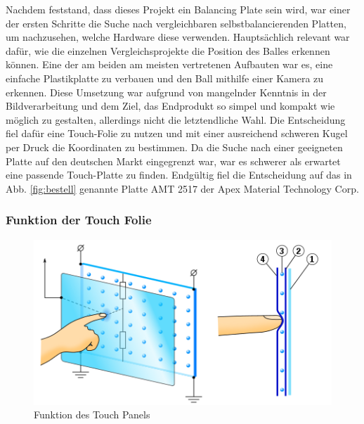 \documentclass[12pt,a4paper,bibliography=totoc,listof=totoc]{scrartcl}
\begin{document}
Nachdem feststand, dass dieses Projekt ein Balancing Plate sein wird, war einer der ersten Schritte die Suche nach vergleichbaren selbstbalancierenden Platten, um nachzusehen, welche Hardware diese verwenden. Hauptsächlich relevant war dafür, wie die einzelnen Vergleichsprojekte die Position des Balles erkennen können. Eine der am beiden am meisten vertretenen Aufbauten war es, eine einfache Plastikplatte zu verbauen und den Ball mithilfe einer Kamera zu erkennen. Diese Umsetzung war aufgrund von mangelnder Kenntnis in der Bildverarbeitung und dem Ziel, das Endprodukt so simpel und kompakt wie möglich zu gestalten, allerdings nicht die letztendliche Wahl. Die Entscheidung fiel dafür eine Touch-Folie zu nutzen und mit einer ausreichend schweren Kugel per Druck die Koordinaten zu bestimmen. Da die Suche nach einer geeigneten Platte auf den deutschen Markt eingegrenzt war, war es schwerer als erwartet eine passende Touch-Platte zu finden. Endgültig fiel die Entscheidung auf das in Abb. \ref{fig:bestell} genannte Platte AMT 2517 der Apex Material Technology Corp.

\subsubsection{Funktion der Touch Folie}

\begin{figure}[htbp]
	\centering
	\includegraphics[scale = 0.6]{pics/TouchScreen_5wires.png}
	\caption{Funktion des Touch Panels} 
	\label{fig:TouchPanelFunction}
\end{figure}
\end{document}
